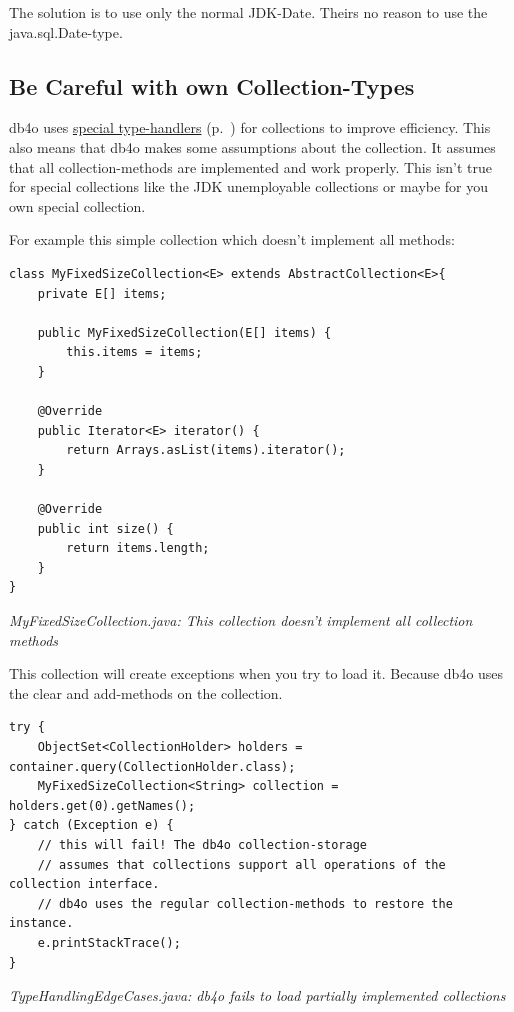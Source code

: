 The solution is to use only the normal JDK-Date. Theirs no reason to use the java.sql.Date-type.

\subsection*{Be Careful with own Collection-Types}

db4o uses \hyperref[ref:advanced-topics-type-handling-typehandlers]{special type-handlers} (p.~\pageref{ref:advanced-topics-type-handling-typehandlers}) for collections to improve efficiency. This also means that db4o makes some assumptions about the collection. It assumes that all collection-methods are implemented and work properly. This isn't true for special collections like the JDK unemployable collections or maybe for you own special collection.

For example this simple collection which doesn't implement all methods:

\begin{lstlisting}
class MyFixedSizeCollection<E> extends AbstractCollection<E>{
    private E[] items;

    public MyFixedSizeCollection(E[] items) {
        this.items = items;
    }

    @Override
    public Iterator<E> iterator() {
        return Arrays.asList(items).iterator();
    }

    @Override
    public int size() {
        return items.length;
    }
}
\end{lstlisting}

{\small\itshape MyFixedSizeCollection.java: This collection doesn't implement all collection methods\par}
\medskip

This collection will create exceptions when you try to load it. Because db4o uses the clear and add-methods on the collection.

\begin{lstlisting}
try {
    ObjectSet<CollectionHolder> holders = container.query(CollectionHolder.class);
    MyFixedSizeCollection<String> collection = holders.get(0).getNames();
} catch (Exception e) {
    // this will fail! The db4o collection-storage
    // assumes that collections support all operations of the collection interface.
    // db4o uses the regular collection-methods to restore the instance.
    e.printStackTrace();
}
\end{lstlisting}

{\small\itshape TypeHandlingEdgeCases.java: db4o fails to load partially implemented collections\par}
\medskip

